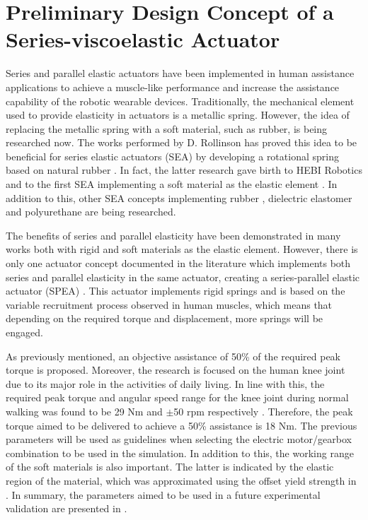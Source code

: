 \section{Preliminary Design Concept of a Series-viscoelastic Actuator}

Series and parallel elastic actuators have been implemented in human assistance applications to achieve a muscle-like performance and increase the assistance capability of the robotic wearable devices. Traditionally, the mechanical element used to provide elasticity in actuators is a metallic spring. However, the idea of replacing the metallic spring with a soft material, such as rubber, is being researched now. The works performed by D. Rollinson has proved this idea to be beneficial for series elastic actuators (SEA) by developing a rotational spring based on natural rubber \cite{rollinson2013design,rollinson2014design}. In fact, the latter research gave birth to HEBI Robotics and to the first SEA implementing a soft material as the elastic element \cite{HEBI2019}. In addition to this, other SEA concepts implementing rubber \cite{austin2015control}, dielectric elastomer \cite{bolivar2016towards} and polyurethane \cite{martins2015polyurethane} are being researched.

The benefits of series and parallel elasticity have been demonstrated in many works both with rigid and soft materials as the elastic element. However, there is only one actuator concept documented in the literature which implements both series and parallel elasticity in the same actuator, creating a series-parallel elastic actuator (SPEA) \cite{mathijssen2014variable}. This actuator implements rigid springs and is based on the variable recruitment process observed in human muscles, which means that depending on the required torque and displacement, more springs will be engaged.

As previously mentioned, an objective assistance of 50\% of the required peak torque is proposed. Moreover, the research is focused on the human knee joint due to its major role in the activities of daily living. In line with this, the required peak torque and angular speed range for the knee joint during normal walking was found to be 29 Nm and $\pm$50 rpm respectively \cite{dos2014impedance,winter2009biomechanics}. Therefore, the peak torque aimed to be delivered to achieve a 50\% assistance is 18 Nm. The previous parameters will be used as guidelines when selecting the electric motor/gearbox combination to be used in the simulation. In addition to this, the working range of the soft materials is also important. The latter is indicated by the elastic region of the material, which was approximated using the offset yield strength in . In summary, the parameters aimed to be used in a future experimental validation are presented in .

